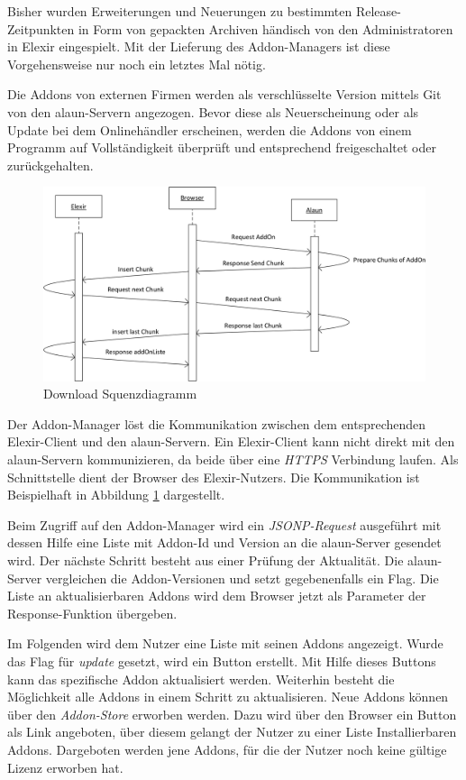 \documentclass[12pt]{article}
\begin{document}
Bisher wurden Erweiterungen und Neuerungen zu bestimmten Release-Zeitpunkten in Form von gepackten Archiven händisch von den Administratoren in Elexir eingespielt. 
Mit der Lieferung des Addon-Managers ist diese Vorgehensweise nur noch ein letztes Mal nötig.

Die Addons von externen Firmen werden als verschlüsselte Version mittels Git von den alaun-Servern angezogen. Bevor diese als Neuerscheinung oder als Update bei dem Onlinehändler erscheinen, werden die Addons von einem Programm auf Vollständigkeit überprüft und entsprechend freigeschaltet oder zurückgehalten. 

\begin{figure}[h]
	\centering
	\includegraphics[width=1.0\textwidth]{Manager.png}
	\caption{Download Squenzdiagramm}
	\label{fig:Manager}
\end{figure}


Der Addon-Manager löst die Kommunikation zwischen dem entsprechenden Elexir-Client und den alaun-Servern. Ein Elexir-Client kann nicht direkt mit den alaun-Servern kommunizieren, da beide über eine \textit{HTTPS} Verbindung laufen. Als Schnittstelle dient der Browser des Elexir-Nutzers.
Die Kommunikation ist Beispielhaft in Abbildung \ref{fig:Manager} dargestellt. 

Beim Zugriff auf den Addon-Manager wird ein \textit{JSONP-Request} ausgeführt mit dessen Hilfe eine Liste mit Addon-Id und Version an die alaun-Server gesendet wird. 
Der nächste Schritt besteht aus einer Prüfung der Aktualität. Die alaun-Server vergleichen die Addon-Versionen und setzt gegebenenfalls ein Flag. 
Die Liste an aktualisierbaren Addons wird dem Browser jetzt als Parameter der Response-Funktion übergeben.

Im Folgenden wird dem Nutzer eine Liste mit seinen Addons angezeigt. Wurde das Flag für \textit{update} gesetzt, wird ein Button erstellt.
Mit Hilfe dieses Buttons kann das spezifische Addon aktualisiert werden. Weiterhin besteht die Möglichkeit alle Addons in einem Schritt zu aktualisieren.
Neue Addons können über den \textit{Addon-Store} erworben werden. Dazu wird über den Browser ein Button als Link angeboten, über diesem gelangt der Nutzer zu einer Liste Installierbaren Addons.
Dargeboten werden jene Addons, für die der Nutzer noch keine gültige Lizenz erworben hat.
\end{document}
